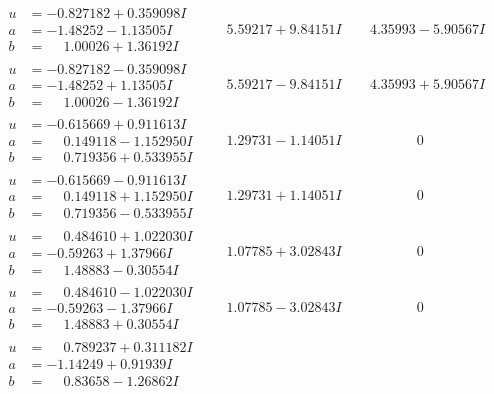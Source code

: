 \documentclass[1p]{elsarticle_modified}
\theoremstyle{definition}
\begin{document}
$$\begin{array}{c|c|c}
\begin{aligned}
u &= -0.827182 + 0.359098 I \\
a &= -1.48252 - 1.13505 I \\
b &= \phantom{-}1.00026 + 1.36192 I\end{aligned}
 & \phantom{-}5.59217 + 9.84151 I & \phantom{-}4.35993 - 5.90567 I \\ \hline\begin{aligned}
u &= -0.827182 - 0.359098 I \\
a &= -1.48252 + 1.13505 I \\
b &= \phantom{-}1.00026 - 1.36192 I\end{aligned}
 & \phantom{-}5.59217 - 9.84151 I & \phantom{-}4.35993 + 5.90567 I \\ \hline\begin{aligned}
u &= -0.615669 + 0.911613 I \\
a &= \phantom{-}0.149118 - 1.152950 I \\
b &= \phantom{-}0.719356 + 0.533955 I\end{aligned}
 & \phantom{-}1.29731 - 1.14051 I & \phantom{-0.000000 } 0 \\ \hline\begin{aligned}
u &= -0.615669 - 0.911613 I \\
a &= \phantom{-}0.149118 + 1.152950 I \\
b &= \phantom{-}0.719356 - 0.533955 I\end{aligned}
 & \phantom{-}1.29731 + 1.14051 I & \phantom{-0.000000 } 0 \\ \hline\begin{aligned}
u &= \phantom{-}0.484610 + 1.022030 I \\
a &= -0.59263 + 1.37966 I \\
b &= \phantom{-}1.48883 - 0.30554 I\end{aligned}
 & \phantom{-}1.07785 + 3.02843 I & \phantom{-0.000000 } 0 \\ \hline\begin{aligned}
u &= \phantom{-}0.484610 - 1.022030 I \\
a &= -0.59263 - 1.37966 I \\
b &= \phantom{-}1.48883 + 0.30554 I\end{aligned}
 & \phantom{-}1.07785 - 3.02843 I & \phantom{-0.000000 } 0 \\ \hline\begin{aligned}
u &= \phantom{-}0.789237 + 0.311182 I \\
a &= -1.14249 + 0.91939 I \\
b &= \phantom{-}0.83658 - 1.26862 I\end{aligned}

\end{array}$$
\end{document}
